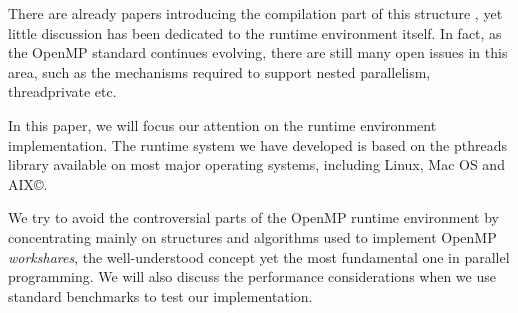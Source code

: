 There are already papers introducing the compilation part of this
structure \cite{Wom03}, yet little discussion has been dedicated to
the runtime environment itself. In fact, as the OpenMP standard
continues evolving, there are still many open issues in this area,
such as the mechanisms required to support nested parallelism,
threadprivate etc.

In this paper, we will focus our attention on the runtime environment
implementation. The runtime system we have developed is based on the
pthreads library available on most major operating systems, including
Linux, Mac OS and AIX\copyright.

We try to avoid the controversial parts of the OpenMP runtime
environment by concentrating mainly on structures and algorithms used
to implement OpenMP \emph{workshares}, the well-understood concept yet
the most fundamental one in parallel programming. We will also discuss
the performance considerations when we use standard benchmarks to 
test our implementation.





